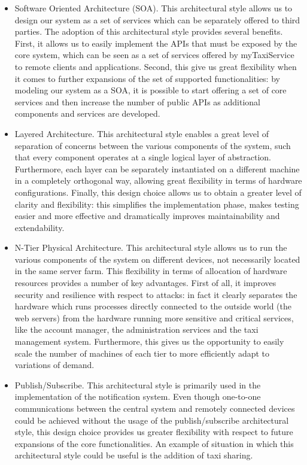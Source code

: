 \begin{itemize}
	\item Software Oriented Architecture (SOA). This architectural style allows us to design our system as a set of services which can be separately offered to third parties. The adoption of this architectural style provides several benefits. First, it allows us to easily implement the APIs that must be exposed by the core system, which can be seen as a set of services offered by myTaxiService to remote clients and applications. Second, this give us great flexibility when it comes to further expansions of the set of supported functionalities: by modeling our system as a SOA, it is possible to start offering a set of core services and then increase the number of public APIs as additional components and services are developed. 
	\item Layered Architecture. This architectural style enables a great level of separation of concerns between the various components of the system, such that every component operates at a single logical layer of abstraction. Furthermore, each layer can be separately instantiated on a different machine in a completely orthogonal way, allowing great flexibility in terms of hardware configurations. Finally, this design choice allows us to obtain a greater level of clarity and flexibility: this simplifies the implementation phase, makes testing easier and more effective and dramatically improves maintainability and extendability.
	\item N-Tier Physical Architecture. This architectural style allows us to run the various components of the system on different devices, not necessarily located in the same server farm. This flexibility in terms of allocation of hardware resources provides a number of key advantages. First of all, it improves security and resilience with respect to attacks: in fact it clearly separates the hardware which runs processes directly connected to the outside world (the web servers) from the hardware running more sensitive and critical services, like the account manager, the administration services and the taxi management system. Furthermore, this gives us the opportunity to easily scale the number of machines of each tier to more efficiently adapt to variations of demand. 
	\item Publish/Subscribe. This architectural style is primarily used in the implementation of the notification system. Even though one-to-one communications between the central system and remotely connected devices could be achieved without the usage of the publish/subscribe architectural style, this design choice provides us greater flexibility with respect to future expansions of the core functionalities. An example of situation in which this architectural style could be useful is the addition of taxi sharing.
\end{itemize}


